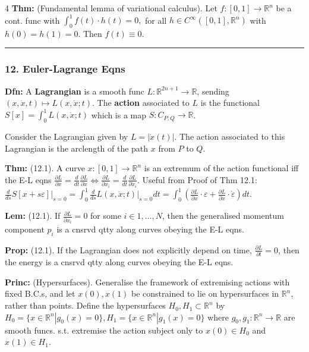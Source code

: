 \documentclass[landscape, 8pt]{extarticle}
\begin{document}
\begin{multicols*}{4}
		\textbf{Thm:} (Fundamental lemma of variational calculus). Let $f:[0,1]\to\mathbb{R}^n$ be a cont. func with
		$
		\int_0^1 f(t)\cdot h(t)=0,
		$
		for all $h\in C^\infty([0,1],\mathbb{R}^n)$ with $h(0)=h(1)=0$. Then $f(t)\equiv 0$.
		
		\hrule
		\vspace*{-3pt}
		\subsubsection*{\tiny{12. Euler-Lagrange Eqns}}
		\vspace*{-5pt}
		
		\textbf{Dfn:} A \textbf{Lagrangian} is a smooth func $L:\mathbb{R}^{2n+1}\to\mathbb{R}$, sending $(x,\dot{x},t)\mapsto L(x,\dot{x};t)$. The \textbf{action} associated to $L$ is the functional
		$
		S[x]=\int_0^1 L(x,\dot{x};t)
		$
		which is a map $S:C_{P,Q}\to\mathbb{R}$.
		
		Consider the Lagrangian given by $L=|\dot{x}(t)|$. The action associated to this Lagrangian is the arclength of the path $x$ from $P$ to $Q$.
		
		\textbf{Thm:} (12.1). A curve $x:[0,1]\to\mathbb{R}^n$ is an extremum of the action functional iff the E-L eqns
		$
		\frac{\partial L}{\partial x}=\frac{d}{dt}\frac{\partial L}{\partial\dot{x}}\Leftrightarrow\frac{\partial L}{\partial x_i}=\frac{d}{dt}\frac{\partial L}{\partial\dot{x}_i}.
		$
		Useful from Proof of Thm 12.1:
		$
		\frac{d}{ds}S[x+s\varepsilon]\big|_{s=0}=\int_0^1\frac{d}{ds}L(x,\dot{x};t)\big|_{s=0}dt
		=\int_0^1\!\!\left(\frac{\partial L}{\partial x}\cdot\varepsilon+\frac{\partial L}{\partial\dot{x}}\cdot\dot\varepsilon\right)dt.
		$
		
		\textbf{Lem:} (12.1). If $\frac{\partial L}{\partial x_i}=0$ for some $i\in 1,\ldots,N$, then the generalised momentum component $p_i$ is a cnsrvd qtty along curves obeying the E-L eqns.
		
		\textbf{Prop:} (12.1). If the Lagrangian does not explicitly depend on time, $\frac{\partial L}{\partial t}=0$, then the energy is a cnsrvd qtty along curves obeying the E-L eqns.
		
		\textbf{Princ:} (Hypersurfaces). Generalise the framework of extremising actions with fixed B.C.s, and let $x(0),x(1)$ be constrained to lie on hypersurfaces in $\mathbb{R}^n$, rather than points. Define the hypersurfaces $H_0,H_1\subset\mathbb{R}^n$ by
		$
		H_0=\{x\in\mathbb{R}^n|g_0(x)=0\}, H_1=\{x\in\mathbb{R}^n|g_1(x)=0\}
		$
		where $g_0,g_1:\mathbb{R}^n\to\mathbb{R}$ are smooth funcs. s.t. extremise the action subject only to $x(0)\in H_0$ and $x(1)\in H_1$.
		

\end{multicols*}
\end{document}
